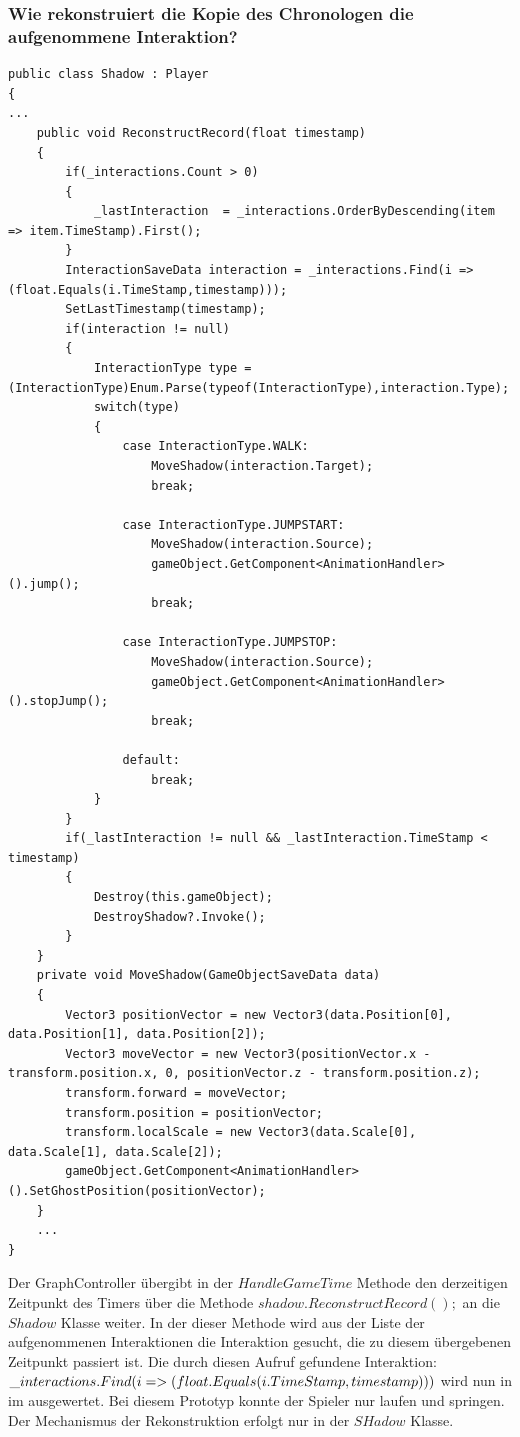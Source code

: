 \subsubsection{Wie rekonstruiert die Kopie des Chronologen die aufgenommene Interaktion?}\label{sec:good_04}
\begin{lstlisting}[caption={Rekonstruktionsmethode aus der Shadow.cs}, label={sec:reconstructing_old}]
public class Shadow : Player
{ 
...
    public void ReconstructRecord(float timestamp)
    {
        if(_interactions.Count > 0)
        {
            _lastInteraction  = _interactions.OrderByDescending(item => item.TimeStamp).First();
        }
        InteractionSaveData interaction = _interactions.Find(i => (float.Equals(i.TimeStamp,timestamp)));
        SetLastTimestamp(timestamp);
        if(interaction != null)
        {
            InteractionType type = (InteractionType)Enum.Parse(typeof(InteractionType),interaction.Type);
            switch(type)
            {
                case InteractionType.WALK:
                    MoveShadow(interaction.Target);
                    break;

                case InteractionType.JUMPSTART:
                    MoveShadow(interaction.Source);
                    gameObject.GetComponent<AnimationHandler>().jump();
                    break;

                case InteractionType.JUMPSTOP:
                    MoveShadow(interaction.Source);
                    gameObject.GetComponent<AnimationHandler>().stopJump();
                    break;

                default:
                    break;
            }
        }
        if(_lastInteraction != null && _lastInteraction.TimeStamp < timestamp)
        {
            Destroy(this.gameObject);
            DestroyShadow?.Invoke();
        }
    }
    private void MoveShadow(GameObjectSaveData data)
    {
        Vector3 positionVector = new Vector3(data.Position[0], data.Position[1], data.Position[2]);
        Vector3 moveVector = new Vector3(positionVector.x - transform.position.x, 0, positionVector.z - transform.position.z);
        transform.forward = moveVector;
        transform.position = positionVector;
        transform.localScale = new Vector3(data.Scale[0], data.Scale[1], data.Scale[2]);
        gameObject.GetComponent<AnimationHandler>().SetGhostPosition(positionVector);
    }
    ...
}
\end{lstlisting}

Der GraphController übergibt in der $HandleGameTime$ Methode den derzeitigen Zeitpunkt des Timers über die Methode $ shadow.ReconstructRecord();$ an die $Shadow$ Klasse weiter. In der dieser Methode wird aus der Liste der aufgenommenen Interaktionen die Interaktion gesucht, die zu diesem übergebenen Zeitpunkt passiert ist. Die durch diesen Aufruf gefundene Interaktion: $\_interactions.Find(i => \\(float.Equals(i.TimeStamp,timestamp)))$ wird nun in im  ausgewertet. Bei diesem Prototyp konnte der Spieler nur laufen und springen.
Der Mechanismus der Rekonstruktion erfolgt nur in der $SHadow$ Klasse.

